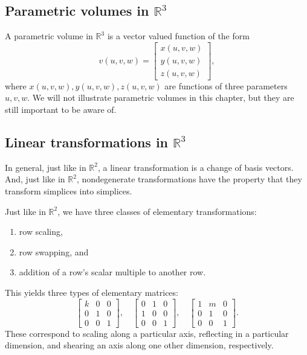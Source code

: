 \subsection{Parametric volumes in \(\mathbb{R}^{3}\)}

A parametric volume in \(\mathbb{R}^{3}\) is a vector valued function of the form
\[
    v(u,v,w)=\begin{bmatrix}
        x(u,v,w) \\ y(u,v,w) \\ z(u,v,w)
    \end{bmatrix},
\]
where \(x(u,v,w),y(u,v,w),z(u,v,w)\) are functions of three parameters \(u,v,w\). 
We will not illustrate parametric volumes in this chapter, but they are still important to be aware of.

\subsection{Linear transformations in \texorpdfstring{\(\mathbb{R}^{3}\)}{R3}}

In general, just like in \(\mathbb{R}^{2}\), a linear transformation is
a change of basis vectors. And, just like in \(\mathbb{R}^{2}\), 
nondegenerate transformations have the property that they transform 
simplices into simplices.

Just like in \(\mathbb{R}^{2}\), we have three classes of elementary
transformations:
\begin{enumerate}
    \item row scaling,
    \item row swapping, and
    \item addition of a row's scalar multiple to another row.
\end{enumerate}
This yields three types of elementary matrices:
\[
    \begin{bmatrix}
        k & 0 & 0 \\
        0 & 1 & 0 \\
        0 & 0 & 1
    \end{bmatrix},\quad
    \begin{bmatrix}
        0 & 1 & 0 \\
        1 & 0 & 0 \\
        0 & 0 & 1
    \end{bmatrix},\quad
    \begin{bmatrix}
        1 & m & 0 \\
        0 & 1 & 0 \\
        0 & 0 & 1
    \end{bmatrix}.
\]
These correspond to scaling along a particular axis, reflecting in a 
particular dimension, and shearing an axis along one other dimension, 
respectively.

